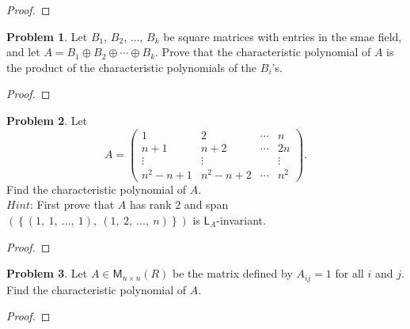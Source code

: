 \documentclass[12pt]{book}
\theoremstyle{definition}
\newtheorem{problem}{Problem}
\begin{document}
	\begin{proof}
	\end{proof}
	\newpage
	\begin{problem}
		Let $B_1$, $B_2$, $\ldots$, $B_k$ be square matrices with entries in the smae field, and let $A=B_1\oplus B_2\oplus\cdots\oplus B_k$. Prove that the characteristic polynomial of $A$ is the product of the characteristic polynomials of the $B_i$'s.
	\end{problem}
	\begin{proof}
	\end{proof}
	\newpage
	\begin{problem}
		Let
		\begin{equation*}
			A=\begin{pmatrix}
				1&2&\cdots&n\\
				n+1&n+2&\cdots&2n\\
				\vdots&\vdots&&\vdots\\
				n^2-n+1&n^2-n+2&\cdots&n^2
			\end{pmatrix}.
		\end{equation*}
		Find the characteristic polynomial of $A$.\\
		$Hint$: First prove that $A$ has rank $2$ and span$\left(\left\{(1,~1,~\ldots,~1),~(1,~2,~\ldots,~n)\right\}\right)$ is $\mathsf{L}_A$-invariant.
	\end{problem}
	\begin{proof}
	\end{proof}
	\newpage
	\begin{problem}
		Let $A\in\mathsf{M}_{n\times n}(R)$ be the matrix defined by $A_{ij}=1$ for all $i$ and $j$. Find the characteristic polynomial of $A$.
	\end{problem}
	\begin{proof}
	\end{proof}
\end{document}
